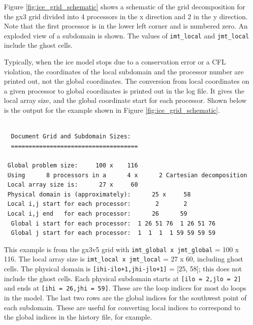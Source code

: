 Figure \ref{fig:ice_grid_schematic} shows a schematic of the grid
decomposition for the gx3 grid divided into 4 processors in the
x direction and 2 in the y direction.  Note that the first processor
is in the lower left corner and is numbered zero.  An exploded view
of a subdomain is shown.  The values of {\tt imt\_local} and 
{\tt jmt\_local} include the ghost cells.  

Typically, when the ice model stops due to a conservation error or
a CFL violation, the coordinates of the local subdomain  and the
processor number are printed out, not the global coordinates.  The
conversion from local coordinates on a given processor to global
coordinates is printed out in the log file.  It gives the local array
size, and the global coordinate start for each processor.  Shown
below is the output for the example shown in Figure \ref{fig:ice_grid_schematic}.

\begin{verbatim}

  Document Grid and Subdomain Sizes:
  ==================================== 
  
 Global problem size:     100 x    116
 Using      8 processors in a      4 x      2 Cartesian decomposition
 Local array size is:      27 x     60 
 Physical domain is (approximately):      25 x     58
 Local i,j start for each processor:       2       2
 Local i,j end   for each processor:      26      59
  Global i start for each processor:  1 26 51 76  1 26 51 76
  Global j start for each processor:  1  1  1  1 59 59 59 59

\end{verbatim}

This example is from the gx3v5 grid with {\tt imt\_global x jmt\_global} = 100 x 116.
The local array size is {\tt imt\_local x jmt\_local} = 27 x 60, including ghost
cells.  The physical domain is {\tt [ihi-ilo+1,jhi-jlo+1]} = [25, 58]; this 
does not include the ghost cells.
Each physical subdomain starts at {\tt [ilo = 2,jlo = 2]} and ends at 
{\tt [ihi = 26,jhi = 59]}.  These are the loop indices for most do 
loops in the model.  The last two rows are the global indices for the
southwest point of each subdomain.  These are useful for converting
local indices to correspond to the global indices in the history
file, for example. 



